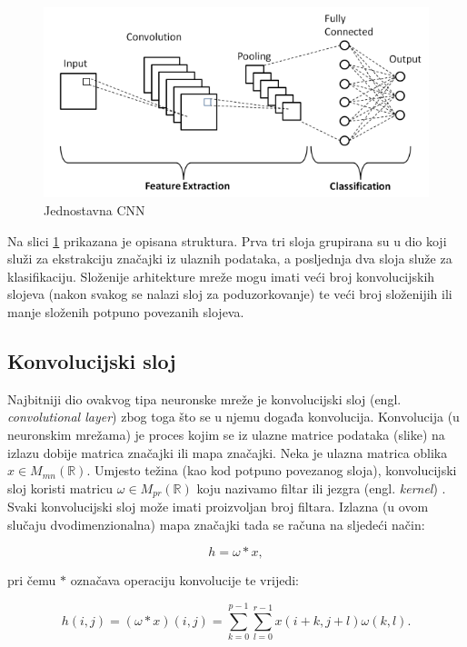 \begin{figure}[htb]
    \centering
    \includegraphics[width=0.5\linewidth]{Chapters/neuronska_mreza/CNN/cnn.png} 
    \caption{Jednostavna CNN \cite{1}}
    \label{pic:cnn}
\end{figure}

Na slici \ref{pic:cnn} prikazana je opisana struktura. Prva tri sloja grupirana su
u dio koji služi za ekstrakciju značajki iz ulaznih podataka, a posljednja dva
sloja služe za klasifikaciju. Složenije arhitekture mreže mogu imati veći broj
konvolucijskih slojeva (nakon svakog se nalazi sloj za poduzorkovanje) te veći broj
složenijih ili manje složenih potpuno povezanih slojeva.

\subsection{Konvolucijski sloj}
\label{sub:conv}

Najbitniji dio ovakvog tipa neuronske mreže je konvolucijski sloj 
(engl. \textit{convolutional layer}) zbog toga što se
u njemu događa konvolucija. Konvolucija (u neuronskim mrežama) je proces kojim se
iz ulazne matrice podataka (slike) na izlazu dobije matrica značajki ili
mapa značajki. Neka je ulazna matrica oblika \( x \in M_{mn}(\mathbb{R}) \).
Umjesto težina (kao kod potpuno povezanog sloja), konvolucijski sloj koristi
matricu \( \omega \in M_{pr}(\mathbb{R}) \) koju nazivamo filtar ili
jezgra (engl. \textit{kernel}) \cite{keras_layers}. Svaki konvolucijski 
sloj može imati proizvoljan broj filtara. Izlazna (u ovom slučaju dvodimenzionalna)
mapa značajki tada se računa na sljedeći način:

\begin{equation}
h = \omega * x,
\end{equation}

pri čemu \( * \) označava operaciju konvolucije te vrijedi:

\begin{equation}
h(i, j) = (\omega * x)(i, j) = 
\sum_{k=0}^{p-1} \sum_{l=0}^{r-1} x(i + k, j + l) \omega(k, l).
\end{equation}


